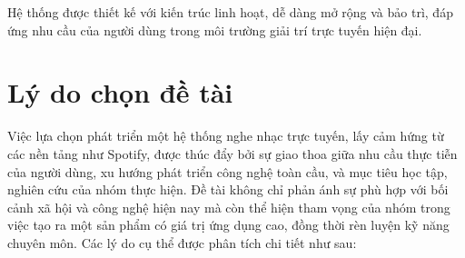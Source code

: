 \documentclass[a4paper,12pt]{report}
\begin{document}
Hệ thống được thiết kế với kiến trúc linh hoạt, dễ dàng mở rộng và bảo trì, đáp ứng nhu cầu của người dùng trong môi trường giải trí trực tuyến hiện đại.


\chapter{Lý do chọn đề tài}
Việc lựa chọn phát triển một hệ thống nghe nhạc trực tuyến, lấy cảm hứng từ các nền tảng như Spotify, được thúc đẩy bởi sự giao thoa giữa nhu cầu thực tiễn của người dùng, xu hướng phát triển công nghệ toàn cầu, và mục tiêu học tập, nghiên cứu của nhóm thực hiện. Đề tài không chỉ phản ánh sự phù hợp với bối cảnh xã hội và công nghệ hiện nay mà còn thể hiện tham vọng của nhóm trong việc tạo ra một sản phẩm có giá trị ứng dụng cao, đồng thời rèn luyện kỹ năng chuyên môn. Các lý do cụ thể được phân tích chi tiết như sau:
\end{document}
